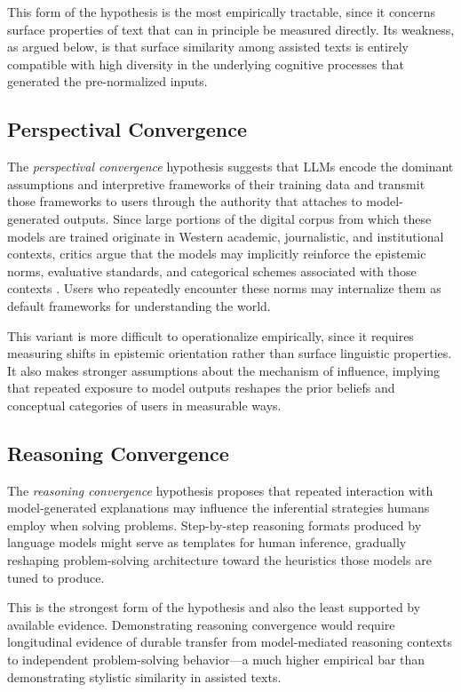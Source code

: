 \documentclass[12pt,a4paper]{article}
\theoremstyle{definition}
\theoremstyle{plain}
\theoremstyle{remark}
\begin{document}
This form of the hypothesis is the most empirically tractable, since it concerns surface
properties of text that can in principle be measured directly. Its weakness, as argued below,
is that surface similarity among assisted texts is entirely compatible with high diversity in
the underlying cognitive processes that generated the pre-normalized inputs.

\subsection{Perspectival Convergence}

The \emph{perspectival convergence} hypothesis suggests that LLMs encode the dominant
assumptions and interpretive frameworks of their training data and transmit those frameworks
to users through the authority that attaches to model-generated outputs. Since large portions
of the digital corpus from which these models are trained originate in Western academic,
journalistic, and institutional contexts, critics argue that the models may implicitly
reinforce the epistemic norms, evaluative standards, and categorical schemes associated with
those contexts \citep{bender2021}. Users who repeatedly encounter these norms may
internalize them as default frameworks for understanding the world.

This variant is more difficult to operationalize empirically, since it requires measuring
shifts in epistemic orientation rather than surface linguistic properties. It also makes
stronger assumptions about the mechanism of influence, implying that repeated exposure to
model outputs reshapes the prior beliefs and conceptual categories of users in measurable
ways.

\subsection{Reasoning Convergence}

The \emph{reasoning convergence} hypothesis proposes that repeated interaction with
model-generated explanations may influence the inferential strategies humans employ when
solving problems. Step-by-step reasoning formats produced by language models might serve
as templates for human inference, gradually reshaping problem-solving architecture toward
the heuristics those models are tuned to produce.

This is the strongest form of the hypothesis and also the least supported by available
evidence. Demonstrating reasoning convergence would require longitudinal evidence of durable
transfer from model-mediated reasoning contexts to independent problem-solving behavior---a
much higher empirical bar than demonstrating stylistic similarity in assisted texts.
\end{document}
